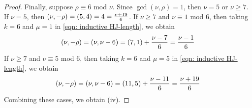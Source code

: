 \documentclass[12pt]{amsart}
\numberwithin{equation}{section}
\newtheorem{prop}[equation]{Proposition}
\theoremstyle{definition}
\newcommand{\Z}{\mathbb Z}
\newcommand{\N}{\mathbb N}
\newcommand{\tx}[1]{\text{#1}}
\let\L\relax
\DeclareMathOperator{\L}{L}
\begin{document}
\begin{proof}
    Finally, suppose $\rho\equiv6$ mod $\nu$. Since $\gcd(\nu,\rho)=1$, then $\nu=5$ or $\nu\geq 7$. If $\nu=5$, then $\L(\nu,-\rho)=\L(5,4)=4=\frac{\nu+19}{6}$. If $\nu\geq 7$ and $\nu\equiv 1$ mod $6$, then taking $k=6$ and $\mu=1$ in
    \eqref{eqn: inductive HJ-length}, we obtain
    \[\L(\nu,-\rho)=\L(\nu,\nu-6)=\L(7,1)+\frac{\nu-7}{6}=\frac{\nu-1}{6}\]
    If $\nu\geq 7$ and $\nu\equiv5$ mod $6$, then taking $k=6$ and $\mu=5$ in \eqref{eqn: inductive HJ-length}, we obtain
    \[\L(\nu,-\rho)=\L(\nu,\nu-6)=\L(11,5)+\frac{\nu-11}{6}=\frac{\nu+19}{6}\]
    Combining these cases, we obtain (iv).
\end{proof}

\end{document}
